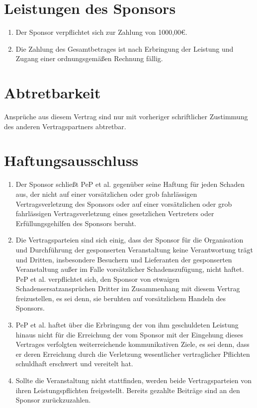\documentclass[
  paper=a4,
  fontsize=12pt,
  DIV=16,
  parskip=full,
  headinclude=true,
]{scrartcl}
\newcommand\sponsorbetrag{1000,00€}    %
\begin{document}
\section{Leistungen des Sponsors}

\begin{enumerate}[\qquad(1)]
  \item Der Sponsor verpflichtet sich zur Zahlung von \sponsorbetrag.
  \item Die Zahlung des Gesamtbetrages ist nach Erbringung der Leistung und
        Zugang einer ordnungsgemäßen Rechnung fällig.
\end{enumerate}

\section{Abtretbarkeit}

Ansprüche aus diesem Vertrag sind nur mit vorheriger schriftlicher Zustimmung des anderen Vertragspartners abtretbar.

\section{Haftungsausschluss}

\begin{enumerate}[\qquad(1)]
  \item Der Sponsor schließt PeP et al. gegenüber seine Haftung für jeden
        Schaden aus, der nicht auf einer vorsätzlichen oder grob fahrlässigen
        Vertragsverletzung des Sponsors oder auf einer vorsätzlichen oder grob
        fahrlässigen Vertragsverletzung eines gesetzlichen Vertreters oder
        Erfüllungsgehilfen des Sponsors beruht.
  \item Die Vertragsparteien sind sich einig, dass der Sponsor für die
        Organisation und Durchführung der gesponserten Veranstaltung keine
        Verantwortung trägt und Dritten, insbesondere Besuchern und Lieferanten
        der gesponserten Veranstaltung außer im Falle vorsätzlicher
        Schadenszufügung, nicht haftet.
        PeP et al. verpflichtet sich, den Sponsor von etwaigen
        Schadensersatzansprüchen Dritter im Zusammenhang mit diesem Vertrag
        freizustellen, es sei denn, sie beruhten auf vorsätzlichem Handeln des
        Sponsors.
  \item PeP et al. haftet über die Erbringung der von ihm geschuldeten
        Leistung hinaus nicht für die Erreichung der vom Sponsor mit der
        Eingehung dieses Vertrages verfolgten weiterreichende kommunikativen
        Ziele, es sei denn, dass er deren Erreichung durch die Verletzung
        wesentlicher vertraglicher Pflichten schuldhaft erschwert und vereitelt
        hat.
  \item Sollte die Veranstaltung nicht stattfinden, werden beide
        Vertragsparteien von ihren Leistungspflichten freigestellt. Bereits
        gezahlte Beiträge sind an den Sponsor zurückzuzahlen.
\end{enumerate}
\end{document}
